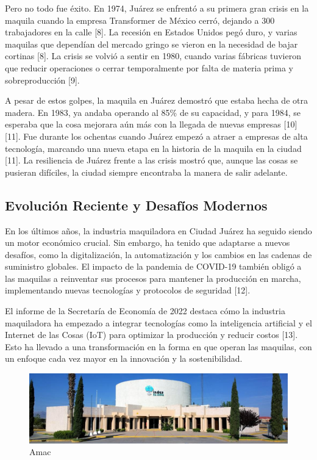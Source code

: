 \documentclass[
  10pt,
  letterpaper,
]{book}
\begin{document}
Pero no todo fue éxito. En 1974, Juárez se enfrentó a su primera gran
crisis en la maquila cuando la empresa Transformer de México cerró,
dejando a 300 trabajadores en la calle {[}8{]}. La recesión en Estados
Unidos pegó duro, y varias maquilas que dependían del mercado gringo se
vieron en la necesidad de bajar cortinas {[}8{]}. La crisis se volvió a
sentir en 1980, cuando varias fábricas tuvieron que reducir operaciones
o cerrar temporalmente por falta de materia prima y sobreproducción
{[}9{]}.

A pesar de estos golpes, la maquila en Juárez demostró que estaba hecha
de otra madera. En 1983, ya andaba operando al 85\% de su capacidad, y
para 1984, se esperaba que la cosa mejorara aún más con la llegada de
nuevas empresas {[}10{]}{[}11{]}. Fue durante los ochentas cuando Juárez
empezó a atraer a empresas de alta tecnología, marcando una nueva etapa
en la historia de la maquila en la ciudad {[}11{]}. La resiliencia de
Juárez frente a las crisis mostró que, aunque las cosas se pusieran
difíciles, la ciudad siempre encontraba la manera de salir adelante.

\subsection{Evolución Reciente y Desafíos
Modernos}\label{evoluciuxf3n-reciente-y-desafuxedos-modernos}

En los últimos años, la industria maquiladora en Ciudad Juárez ha
seguido siendo un motor económico crucial. Sin embargo, ha tenido que
adaptarse a nuevos desafíos, como la digitalización, la automatización y
los cambios en las cadenas de suministro globales. El impacto de la
pandemia de COVID-19 también obligó a las maquilas a reinventar sus
procesos para mantener la producción en marcha, implementando nuevas
tecnologías y protocolos de seguridad {[}12{]}.

El informe de la Secretaría de Economía de 2022 destaca cómo la
industria maquiladora ha empezado a integrar tecnologías como la
inteligencia artificial y el Internet de las Cosas (IoT) para optimizar
la producción y reducir costos {[}13{]}. Esto ha llevado a una
transformación en la forma en que operan las maquilas, con un enfoque
cada vez mayor en la innovación y la sostenibilidad.

\begin{figure}[H]

{\centering \includegraphics{Img/Amac.jpg}

}

\caption{Amac}

\end{figure}%
\end{document}

